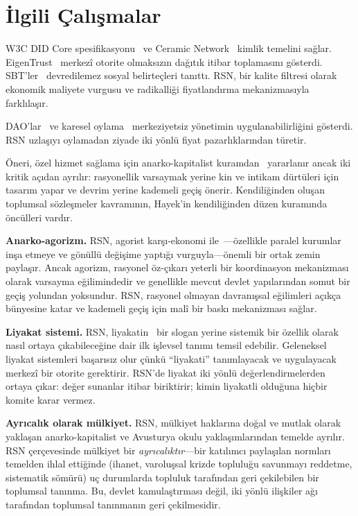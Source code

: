 \documentclass[11pt,a4paper,twocolumn]{article}
\begin{document}
\section{İlgili Çalışmalar}

W3C DID Core spesifikasyonu~\cite{did2022} ve Ceramic Network~\cite{ceramic2023} kimlik temelini sağlar. EigenTrust~\cite{kamvar2003} merkezî otorite olmaksızın dağıtık itibar toplamasını gösterdi. SBT'ler~\cite{weyl2022} devredilemez sosyal belirteçleri tanıttı. RSN, bir kalite filtresi olarak ekonomik maliyete vurgusu ve radikalliği fiyatlandırma mekanizmasıyla farklılaşır.

DAO'lar~\cite{buterin2014} ve karesel oylama~\cite{buterin2019} merkeziyetsiz yönetimin uygulanabilirliğini gösterdi. RSN uzlaşıyı oylamadan ziyade iki yönlü fiyat pazarlıklarından türetir.

Öneri, özel hizmet sağlama için anarko-kapitalist kuramdan~\cite{rothbard1973,hoppe2001} yararlanır ancak iki kritik açıdan ayrılır: rasyonellik varsaymak yerine kin ve intikam dürtüleri için tasarım yapar ve devrim yerine kademeli geçiş önerir. Kendiliğinden oluşan toplumsal sözleşmeler kavramının, Hayek'in kendiliğinden düzen kuramında~\cite{hayek1973} öncülleri vardır.

\textbf{Anarko-agorizm.} RSN, agorist karşı-ekonomi ile~\cite{konkin2006}---özellikle paralel kurumlar inşa etmeye ve gönüllü değişime yaptığı vurguyla---önemli bir ortak zemin paylaşır. Ancak agorizm, rasyonel öz-çıkarı yeterli bir koordinasyon mekanizması olarak varsayma eğilimindedir ve genellikle mevcut devlet yapılarından somut bir geçiş yolundan yoksundur. RSN, rasyonel olmayan davranışsal eğilimleri açıkça bünyesine katar ve kademeli geçiş için malî bir baskı mekanizması sağlar.

\textbf{Liyakat sistemi.} RSN, liyakatin~\cite{young1958} bir slogan yerine sistemik bir özellik olarak nasıl ortaya çıkabileceğine dair ilk işlevsel tanımı temsil edebilir. Geleneksel liyakat sistemleri başarısız olur çünkü ``liyakati'' tanımlayacak ve uygulayacak merkezî bir otorite gerektirir. RSN'de liyakat iki yönlü değerlendirmelerden ortaya çıkar: değer sunanlar itibar biriktirir; kimin liyakatli olduğuna hiçbir komite karar vermez.

\textbf{Ayrıcalık olarak mülkiyet.} RSN, mülkiyet haklarına doğal ve mutlak olarak yaklaşan anarko-kapitalist ve Avusturya okulu yaklaşımlarından temelde ayrılır. RSN çerçevesinde mülkiyet bir \emph{ayrıcalıktır}---bir katılımcı paylaşılan normları temelden ihlal ettiğinde (ihanet, varoluşsal krizde topluluğu savunmayı reddetme, sistematik sömürü) uç durumlarda topluluk tarafından geri çekilebilen bir toplumsal tanınma. Bu, devlet kamulaştırması değil, iki yönlü ilişkiler ağı tarafından toplumsal tanınmanın geri çekilmesidir.
\end{document}
